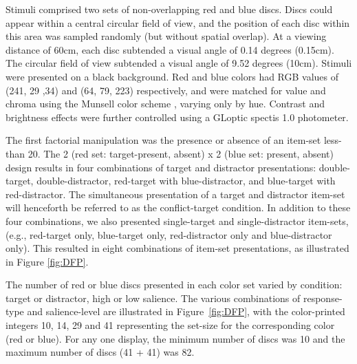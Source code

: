 Stimuli comprised two sets of non-overlapping red and blue discs. Discs could appear within a central circular field of view, and the position of each disc within this area was sampled randomly (but without spatial overlap). At a viewing distance of 60cm, each disc subtended a visual angle of 0.14 degrees (0.15cm). The circular field of view subtended a visual angle of 9.52 degrees (10cm). Stimuli were presented on a black background. Red and blue colors had RGB values of (241, 29 ,34) and (64, 79, 223) respectively, and were matched for value and chroma using the Munsell color scheme \cite{Cochrane2014}, varying only by hue. Contrast and brightness effects were further controlled using a GLoptic spectis 1.0 photometer.

The first factorial manipulation was the presence or absence of an item-set less-than 20. The 2 (red set: target-present, absent) x 2 (blue set: present, absent) design results in four combinations of target and distractor presentations: double-target, double-distractor, red-target with blue-distractor, and blue-target with red-distractor. The simultaneous presentation of a target and distractor item-set will henceforth be referred to as the conflict-target condition. In addition to these four combinations, we also presented single-target and single-distractor item-sets, (e.g., red-target only, blue-target only, red-distractor only and blue-distractor only). This resulted in eight combinations of item-set presentations, as illustrated in Figure \ref{fig:DFP}. 

The number of red or blue discs presented in each color set varied by condition: target or distractor, high or low salience. The various combinations of response-type and salience-level are illustrated in Figure~\ref{fig:DFP}, with the color-printed integers 10, 14, 29 and 41 representing the set-size for the corresponding color (red or blue). For any one display, the minimum number of discs was 10 and the maximum number of discs (41 + 41) was 82.



